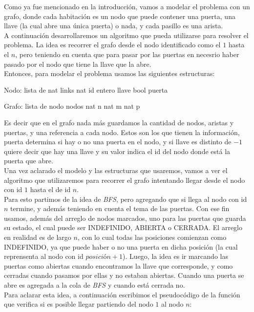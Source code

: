 Como ya fue mencionado en la introducción, vamos a modelar el problema con un grafo, donde cada habitación es un nodo que puede contener una puerta, una llave (la cual abre una única puerta) o nada, y cada pasillo es una arista. \\
A continuación desarrollaremos un algoritmo que pueda utilizarse para resolver el problema. La idea es recorrer el grafo desde el nodo identificado como el $1$ hasta el $n$, pero teniendo en cuenta que para pasar por las puertas en necesrio haber pasado por el nodo que tiene la llave que la abre. \\
Entonces, para modelar el problema usamos las siguientes estructuras:

\begin{verbatimtab}
Nodo:
	lista de nat links
	nat id
	entero llave
	bool puerta
\end{verbatimtab}

\begin{verbatimtab}
Grafo:
	lista de nodo nodos
	nat n
	nat m
	nat p
\end{verbatimtab}

Es decir que en el grafo nada más guardamos la cantidad de nodos, aristas y puertas, y una referencia a cada nodo. Estos son los que tienen la información, puerta determina si hay o no una puerta en el nodo, y si llave es distinto de $-1$ quiere decir que hay una llave y su valor indica el id del nodo donde está la puerta que abre. \\
Una vez aclarado el modelo y las estructuras que usaremos, vamos a ver el algoritmo que utilizaremos para recorrer el grafo intentando llegar desde el nodo con id $1$ hasta el de id $n$. \\
Para esto partimos de la idea de \textit{BFS}, pero agregando que si llega al nodo con id $n$ termine, y además teniendo en cuenta el tema de las puertas. Con ese fin usamos, además del arreglo de nodos marcados, uno para las puertas que guarda su estado, el cual puede ser INDEFINIDO, ABIERTA o CERRADA. El arreglo en realidad es de largo $n$, con lo cual todas las posiciones comienzan como INDEFINIDO, ya que puede haber o no una puerta en dicha posición (la cual reprensenta al nodo con id $posición + 1$). Luego, la idea es ir marcando las puertas como abiertas cuando encontramos la llave que corresponde, y como cerradas cuando pasamos por ellas y no estaban abiertas. Cuando una puerta se abre es agregada a la cola de \textit{BFS} y cuando está cerrada no. \\
Para aclarar esta idea, a continuación escribimos el pseudocódigo de la función que verifica si es posible llegar partiendo del nodo $1$ al nodo $n$:


